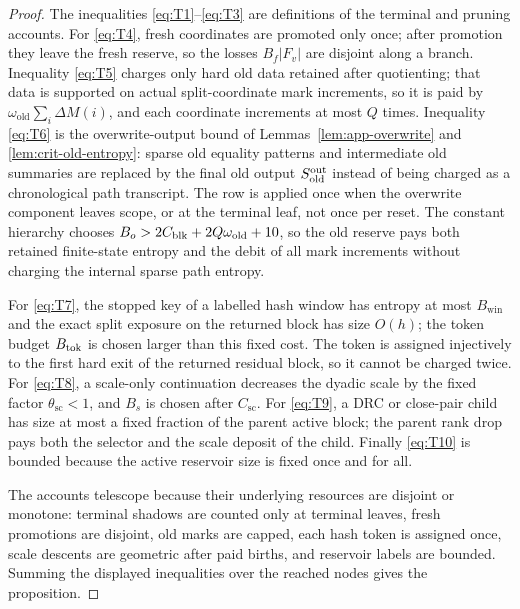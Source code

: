 \documentclass[11pt]{article}
\theoremstyle{remark}
\newcommand{\win}{\mathrm{win}}
\newcommand{\old}{\mathrm{old}}
\newcommand{\scal}{\mathrm{sc}}
\begin{document}
\begin{proof}
The inequalities \eqref{eq:T1}--\eqref{eq:T3} are definitions of the terminal and pruning accounts.  For \eqref{eq:T4}, fresh coordinates are promoted only once; after promotion they leave the fresh reserve, so the losses $B_f|F_v|$ are disjoint along a branch.  Inequality \eqref{eq:T5} charges only hard old data retained after quotienting; that data is supported on actual split-coordinate mark increments, so it is paid by $\omega_{\old}\sum_i\Delta M(i)$, and each coordinate increments at most $Q$ times.  Inequality \eqref{eq:T6} is the overwrite-output bound of Lemmas~\ref{lem:app-overwrite} and \ref{lem:crit-old-entropy}: sparse old equality patterns and intermediate old summaries are replaced by the final old output $S_{\old}^{\rm out}$ instead of being charged as a chronological path transcript.  The row is applied once when the overwrite component leaves scope, or at the terminal leaf, not once per reset.  The constant hierarchy chooses $B_o>2C_{\rm blk}+2Q\omega_{\old}+10$, so the old reserve pays both retained finite-state entropy and the debit of all mark increments without charging the internal sparse path entropy.

For \eqref{eq:T7}, the stopped key of a labelled hash window has entropy at most $B_{\win}$ and the exact split exposure on the returned block has size $O(h)$; the token budget $B_{\rm tok}$ is chosen larger than this fixed cost.  The token is assigned injectively to the first hard exit of the returned residual block, so it cannot be charged twice.  For \eqref{eq:T8}, a scale-only continuation decreases the dyadic scale by the fixed factor $\theta_{\scal}<1$, and $B_s$ is chosen after $C_{\scal}$.  For \eqref{eq:T9}, a DRC or close-pair child has size at most a fixed fraction of the parent active block; the parent rank drop pays both the selector and the scale deposit of the child.  Finally \eqref{eq:T10} is bounded because the active reservoir size is fixed once and for all.

The accounts telescope because their underlying resources are disjoint or monotone: terminal shadows are counted only at terminal leaves, fresh promotions are disjoint, old marks are capped, each hash token is assigned once, scale descents are geometric after paid births, and reservoir labels are bounded.  Summing the displayed inequalities over the reached nodes gives the proposition.
\end{proof}
\end{document}
